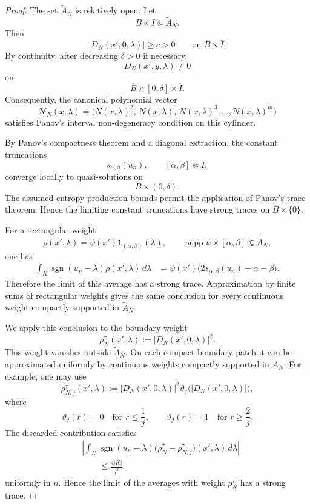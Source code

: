 \documentclass[10pt,a4paper]{amsart}
\begin{document}
\begin{proof}
The set \(\widetilde A_N\) is relatively open.  Let
\[
    B\times I\Subset\widetilde A_N.
\]
Then
\[
    |D_N(x',0,\lambda)|\ge c>0
    \qquad
    \text{on }\overline B\times\overline I.
\]
By continuity, after decreasing \(\delta>0\) if necessary,
\[
    D_N(x',y,\lambda)\neq0
\]
on
\[
    \overline B\times[0,\delta]\times\overline I.
\]
Consequently, the canonical polynomial vector
\[
    \mathcal N_N(x,\lambda)
    =
    \bigl(
        N(x,\lambda)^2,\,
        N(x,\lambda),\,
        N(x,\lambda)^3,\ldots,
        N(x,\lambda)^m
    \bigr)
\]
satisfies Panov's interval non-degeneracy condition on this cylinder.

By Panov's compactness theorem and a diagonal extraction, the constant
truncations
\[
    s_{\alpha,\beta}(u_n),
    \qquad
    [\alpha,\beta]\Subset I,
\]
converge locally to quasi-solutions on
\[
    B\times(0,\delta).
\]
The assumed entropy-production bounds permit the application of Panov's trace
theorem.  Hence the limiting constant truncations have strong traces on
\(B\times\{0\}\).

For a rectangular weight
\[
    \rho(x',\lambda)
    =
    \psi(x')\mathbf 1_{(\alpha,\beta)}(\lambda),
    \qquad
    \operatorname{supp}\psi
    \times[\alpha,\beta]
    \Subset\widetilde A_N,
\]
one has
\[
\begin{aligned}
    \int_K
        \operatorname{sgn}(u_n-\lambda)
        \rho(x',\lambda)\,d\lambda
    &=
    \psi(x')
    \bigl(
        2s_{\alpha,\beta}(u_n)-\alpha-\beta
    \bigr).
\end{aligned}
\]
Therefore the limit of this average has a strong trace.  Approximation by
finite sums of rectangular weights gives the same conclusion for every
continuous weight compactly supported in \(\widetilde A_N\).

We apply this conclusion to the boundary weight
\[
    \rho_N^\tau(x',\lambda)
    :=
    |D_N(x',0,\lambda)|^2.
\]
This weight vanishes outside \(\widetilde A_N\).  On each compact boundary
patch it can be approximated uniformly by continuous weights compactly
supported in \(\widetilde A_N\).  For example, one may use
\[
    \rho_{N,j}^\tau(x',\lambda)
    :=
    |D_N(x',0,\lambda)|^2
    \vartheta_j\bigl(|D_N(x',0,\lambda)|\bigr),
\]
where
\[
    \vartheta_j(r)=0
    \quad\text{for }r\le\frac1j,
    \qquad
    \vartheta_j(r)=1
    \quad\text{for }r\ge\frac2j.
\]
The discarded contribution satisfies
\[
\begin{aligned}
&\left|
    \int_K
        \operatorname{sgn}(u_n-\lambda)
        \bigl(
            \rho_N^\tau-\rho_{N,j}^\tau
        \bigr)(x',\lambda)\,d\lambda
\right|
\\
&\qquad\le
    \frac{4|K|}{j^2},
\end{aligned}
\]
uniformly in \(n\).  Hence the limit of the averages with weight
\(\rho_N^\tau\) has a strong trace.


\end{proof}
\end{document}
